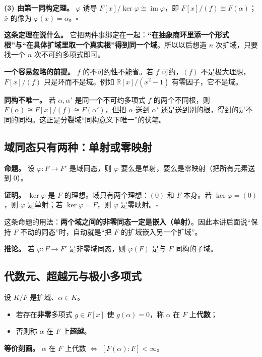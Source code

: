 \textbf{(3) 由第一同构定理。} $\varphi$ 诱导 $F[x]/\ker\varphi\cong\operatorname{im}\varphi$，即 $F[x]/(f)\cong F(\alpha)$；$\bar x$ 的像为 $\varphi(x)=\alpha$。$\square$

\textbf{这条定理在说什么。} 它把两件事绑定在一起：\textbf{“在抽象商环里添一个形式根”与“在具体扩域里取一个真实根”得到同一个域}。所以以后想造 $n$ 次扩域，只要找一个 $n$ 次不可约多项式即可。

\textbf{一个容易忽略的前提。} $f$ 的不可约性不能省。若 $f$ 可约，$(f)$ 不是极大理想，$F[x]/(f)$ 只是环而不是域。例如 $\mathbb R[x]/(x^2-1)$ 有零因子，它不是域。

\textbf{同构不唯一。} 若 $\alpha,\alpha'$ 是同一个不可约多项式 $f$ 的两个不同根，则 $F(\alpha)\cong F[x]/(f)\cong F(\alpha')$，但把 $\alpha$ 送到 $\alpha'$ 还是送到别的根，得到的是不同的同构。这正是分裂域“同构意义下唯一”的伏笔。

\subsection{域同态只有两种：单射或零映射}


\textbf{命题。} 设 $\varphi:F\to F'$ 是域同态，则 $\varphi$ 要么是单射，要么是零映射（把所有元素送到 $0$）。

\textbf{证明。} $\ker\varphi$ 是 $F$ 的理想。域只有两个理想：$(0)$ 和 $F$ 本身。若 $\ker\varphi=(0)$，则 $\varphi$ 是单射；若 $\ker\varphi=F$，则 $\varphi$ 是零映射。$\square$

这条命题的用法：\textbf{两个域之间的非零同态一定是嵌入（单射）}。因此本讲后面说“保持 $F$ 不动的同态”时，自动就是“把 $F$ 的扩域嵌入另一个扩域”。

\textbf{推论。} 若 $\varphi:F\to F'$ 是非零域同态，则 $\varphi(F)$ 是与 $F$ 同构的子域。

\subsection{代数元、超越元与极小多项式}


设 $K/F$ 是扩域、$\alpha\in K$。

\begin{itemize}
\item 若存在\textbf{非零}多项式 $g\in F[x]$ 使 $g(\alpha)=0$，称 $\alpha$ 在 $F$ 上\textbf{代数}；
\item 否则称 $\alpha$ 在 $F$ 上\textbf{超越}。
\end{itemize}


\textbf{等价刻画。} $\alpha$ 在 $F$ 上代数 $\iff$ $[F(\alpha):F]<\infty$。


